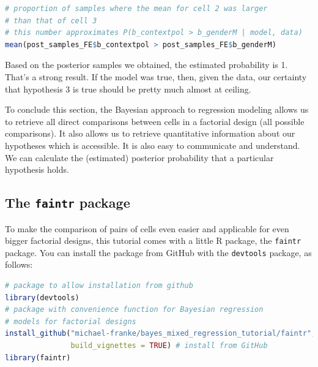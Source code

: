 \documentclass[nobib]{tufte-handout}
\begin{document}
\bigskip

\begin{minipage}[]{1.1\textwidth}
\begin{lstlisting}[language=R]
# proportion of samples where the mean for cell 2 was larger 
# than that of cell 3 
# this number approximates P(b_contextpol > b_genderM | model, data)
mean(post_samples_FE$b_contextpol > post_samples_FE$b_genderM)
\end{lstlisting}
\end{minipage}

Based on the posterior samples we obtained, the estimated probability is 1. That's a strong result. If the model was true, then, given the data, our certainty that hypothesis 3 is true should be pretty much almost at ceiling.

To conclude this section, the Bayesian approach to regression modeling allows us to retrieve all direct comparisons between cells in a factorial design (all possible comparisons). It also allows us to retrieve quantitative information about our hypotheses which is accessible. It is also easy to communicate and understand. We can calculate the (estimated) posterior probability that a particular hypothesis holds. %

\subsection{The \texttt{faintr} package}

To make the comparison of pairs of cells even easier and applicable for even bigger factorial designs, this tutorial comes with a little R package, the \texttt{faintr} package.
%
%
You can install the package from GitHub with the \texttt{devtools} package, as follows:

\begin{minipage}[]{1.3\textwidth}
\begin{lstlisting}[language=R]
# package to allow installation from github
library(devtools)
# package with convenience function for Bayesian regression 
# models for factorial designs
install_github("michael-franke/bayes_mixed_regression_tutorial/faintr", 
               build_vignettes = TRUE) # install from GitHub
library(faintr)
\end{lstlisting}
\end{minipage}
\end{document}
